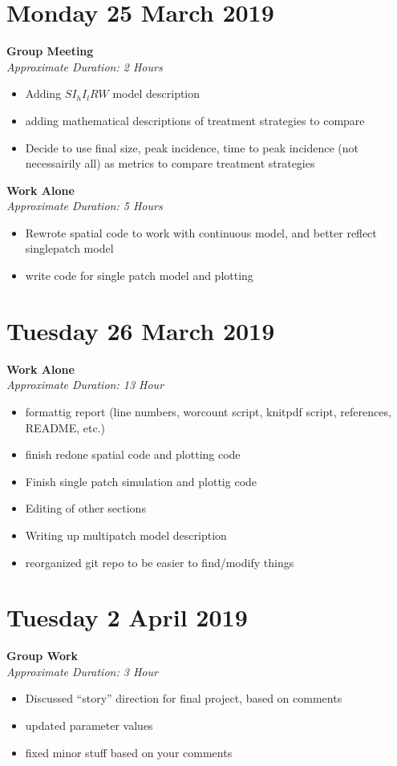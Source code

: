 \documentclass[12pt]{article}\usepackage[]{graphicx}\usepackage[]{color}
\begin{document}
\section*{Monday 25 March 2019}
\textbf{Group Meeting} \\
\emph{Approximate Duration: 2 Hours}
\begin{itemize}
    \item Adding $S I_h I_l R W$ model description
    \item adding mathematical descriptions of treatment strategies to compare
    \item Decide to use final size, peak incidence, time to peak incidence (not necessairily all) as metrics to compare treatment strategies
\end{itemize}
\textbf{Work Alone} \\
\emph{Approximate Duration: 5 Hours}
\begin{itemize}
    \item Rewrote spatial code to work with continuous model, and better reflect singlepatch model
    \item write code for single patch model and plotting
\end{itemize}
\section*{Tuesday 26 March 2019}
\textbf{Work Alone} \\
\emph{Approximate Duration: 13 Hour}
\begin{itemize}
    \item formattig report (line numbers, worcount script, knitpdf script, references, README, etc.)
    \item finish redone spatial code and plotting code
    \item Finish single patch simulation and plottig code
    \item Editing of other sections
    \item Writing up multipatch model description
    \item reorganized git repo to be easier to find/modify things
\end{itemize}
\section*{Tuesday 2 April 2019}
\textbf{Group Work} \\
\emph{Approximate Duration: 3 Hour}
\begin{itemize}
    \item Discussed ``story'' direction for final project, based on comments
    \item updated parameter values
    \item fixed minor stuff based on your comments
\end{itemize}
\end{document}
